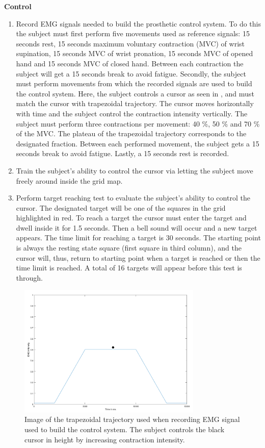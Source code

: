 \textbf{{Control}} \\
\vspace{-25pt}
\begin{enumerate}
	\item Record EMG signals needed to build the prosthetic control system. To do this the subject must first perform  five movements used as reference signals: 15 seconds rest, 15 seconds maximum voluntary contraction (MVC) of wrist supination, 15 seconds MVC of wrist pronation, 15 seconds MVC of opened hand and 15 seconds MVC of closed hand. Between each contraction the subject will get a 15 seconds break to avoid fatigue. Secondly, the subject must perform movements from which the recorded signals are used to build the control system. Here, the subject controls a cursor as seen in , and must match the cursor with trapezoidal trajectory. The cursor moves horizontally with time and the subject control the contraction intensity vertically. The subject must perform three contractions per movement: 40 \%, 50 \% and 70 \% of the MVC. The plateau of the trapezoidal trajectory corresponds to the designated fraction. Between each performed movement, the subject gets a 15 seconds break to avoid fatigue. Lastly, a 15 seconds rest is recorded. 
	\item Train the subject's ability to control the cursor via letting the subject move freely around inside the grid map.
	\item Perform target reaching test to evaluate the subject's ability to control the cursor. The designated target will be one of the squares in the grid highlighted in red. To reach a target the cursor must enter the target and dwell inside it for 1.5 seconds. Then a bell sound will occur and a new target appears. The time limit for reaching a target is 30 seconds. The starting point is always the resting state square (first square in third column), and the cursor will, thus, return to starting point when a target is reached or then the time limit is reached. A total of 16 targets will appear before this test is through.
\end{enumerate}

\begin{figure}[H]                 
	\includegraphics[width=0.78\textwidth]{figures/trapezoid2}  
	\caption{Image of the trapezoidal trajectory used when recording EMG signal used to build the control system. The subject controls the black cursor in height by increasing contraction intensity.}
	\label{fig:trapezoid} 
\end{figure}

